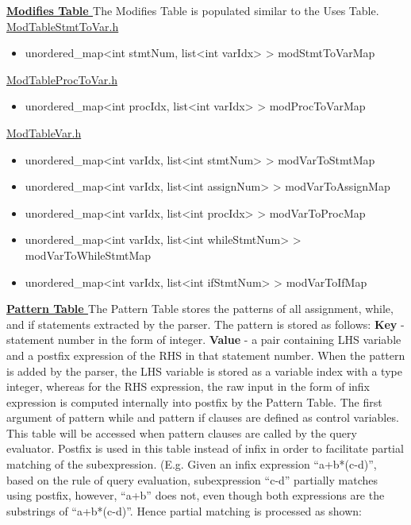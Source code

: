 \documentclass[12pt]{article}
\begin{document}
\textbf{\underline{Modifies Table
}}
\newline The Modifies Table is populated similar to the Uses Table. \newline
\underline{ModTableStmtToVar.h}
\begin{itemize}
\item unordered\_map<int stmtNum, list<int varIdx> > modStmtToVarMap
\end{itemize}
\underline{ModTableProcToVar.h}
\begin{itemize}
\item unordered\_map<int procIdx, list<int varIdx> > modProcToVarMap
\end{itemize}
\underline{ModTableVar.h}
\begin{itemize}
\item unordered\_map<int varIdx, list<int stmtNum> > modVarToStmtMap
\item unordered\_map<int varIdx, list<int assignNum> > modVarToAssignMap
\item unordered\_map<int varIdx, list<int procIdx> > modVarToProcMap
\item unordered\_map<int varIdx, list<int whileStmtNum> > modVarToWhileStmtMap
\item unordered\_map<int varIdx, list<int ifStmtNum> > modVarToIfMap
\end{itemize}
\textbf{\underline{Pattern Table
}}
\newline The Pattern Table stores the patterns of all assignment, while, and if statements extracted by the parser. The pattern is stored as follows:\newline
\textbf{Key }- statement number in the form of integer.\newline
\textbf{Value} - a pair containing LHS variable and a postfix expression of the RHS in that statement number. \newline
When the pattern is added by the parser, the LHS variable is stored as a variable index with a type integer, whereas for the RHS expression, the raw input in the form of infix expression is computed internally into postfix by the Pattern Table. The first argument of pattern while and pattern if clauses are defined as control variables. This table will be accessed when pattern clauses are called by the query evaluator. Postfix is used in this table instead of infix in order to facilitate partial matching of the subexpression. \newline (E.g. 
Given an infix expression “a+b*(c-d)”, based on the rule of query evaluation, subexpression “c-d” partially matches using postfix, however, “a+b” does not, even though both expressions are the substrings of “a+b*(c-d)”. Hence partial matching is processed as shown:
\end{document}
